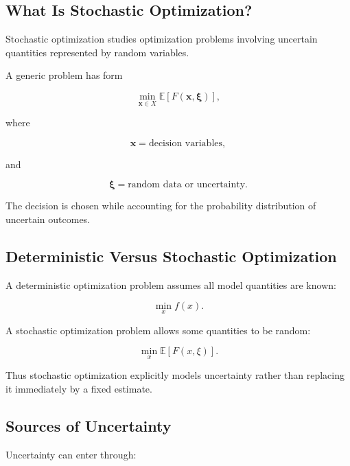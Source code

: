 \subsection{What Is Stochastic Optimization?}
\label{subsec:what-is-stochastic-optimization}

Stochastic optimization studies optimization problems involving uncertain
quantities represented by random variables.

A generic problem has form

\[
\boxed{
\min_{\mathbf{x}\in X}
\mathbb{E}
\left[
F(\mathbf{x},\boldsymbol{\xi})
\right],
}
\]

where

\[
\mathbf{x}
=
\text{decision variables},
\]

and

\[
\boldsymbol{\xi}
=
\text{random data or uncertainty}.
\]

The decision is chosen while accounting for the probability distribution
of uncertain outcomes.

\subsection{Deterministic Versus Stochastic Optimization}
\label{subsec:deterministic-versus-stochastic-optimization}

A deterministic optimization problem assumes all model quantities are
known:

\[
\boxed{
\min_x
f(x).
}
\]

A stochastic optimization problem allows some quantities to be random:

\[
\boxed{
\min_x
\mathbb{E}
[
F(x,\xi)
].
}
\]

Thus stochastic optimization explicitly models uncertainty rather than
replacing it immediately by a fixed estimate.

\subsection{Sources of Uncertainty}
\label{subsec:sources-of-uncertainty}

Uncertainty can enter through:

